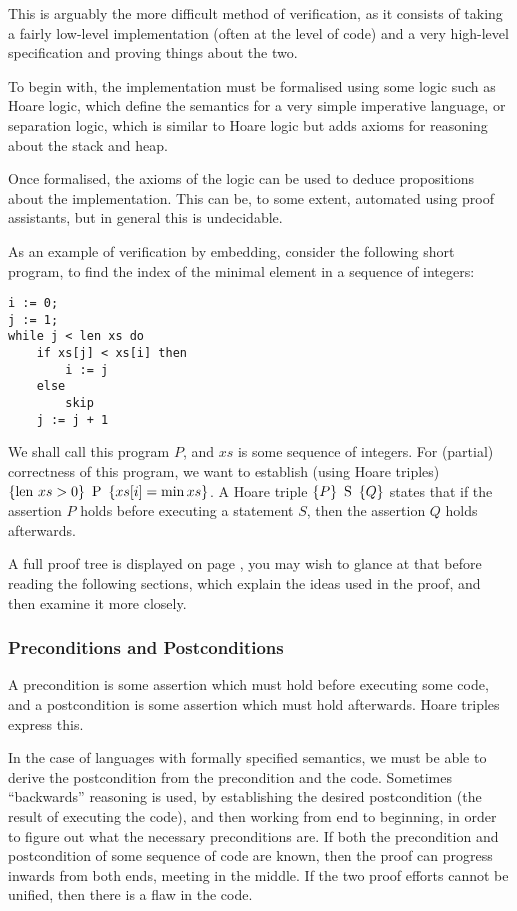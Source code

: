 This is arguably the more difficult method of verification, as it
consists of taking a fairly low-level implementation (often at the
level of code) and a very high-level specification and proving things
about the two.

To begin with, the implementation must be formalised using some logic
such as Hoare logic\cite{Hoare69}, which define the semantics for a
very simple imperative language, or separation logic\cite{Reynolds02},
which is similar to Hoare logic but adds axioms for reasoning about
the stack and heap.

Once formalised, the axioms of the logic can be used to deduce
propositions about the implementation. This can be, to some extent,
automated using \glspl{proof assistant}, but in general this is
undecidable.

As an example of \gls{verification by embedding}, consider the
following short program, to find the index of the minimal element in a
sequence of integers:

\begin{verbatim}
i := 0;
j := 1;
while j < len xs do
    if xs[j] < xs[i] then
        i := j
    else
        skip
    j := j + 1
\end{verbatim}

We shall call this program $P$, and $xs$ is some sequence of
integers. For (partial) correctness of this program, we want to
establish (using Hoare triples) $\left\{\mathrm{len}~ xs > 0\right\}\ \mbox{P}\ \left\{xs[i] = \min
  xs\right\}$. A Hoare triple $\left\{P\right\}\ \mbox{S}\ \left\{Q\right\}$ states that if the
assertion $P$ holds before executing a statement $S$, then the
assertion $Q$ holds afterwards.

A full proof tree is displayed on page \pageref{lit_hoare_proof}, you
may wish to glance at that before reading the following sections,
which explain the ideas used in the proof, and then examine it more
closely.

\subsubsection{Preconditions and Postconditions}

A precondition is some assertion which must hold before executing some
code, and a postcondition is some assertion which must hold
afterwards. Hoare triples express this.

In the case of languages with formally specified semantics, we must be
able to derive the postcondition from the precondition and the
code. Sometimes ``backwards'' reasoning is used, by establishing the
desired postcondition (the result of executing the code), and then
working from end to beginning, in order to figure out what the
necessary preconditions are. If both the precondition and
postcondition of some sequence of code are known, then the proof can
progress inwards from both ends, meeting in the middle. If the two
proof efforts cannot be unified, then there is a flaw in the code.

